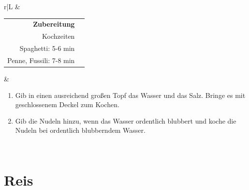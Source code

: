 \documentclass[a4paper, 12pt]{scrbook} 								%
\numberwithin{equation}{section} 									%
\begin{document}
\begin{tabularx}{\textwidth}{r|L}
								&	\\	
		\begin{tabular}[t]{rr}
			\textbf{Zubereitung}	\\
			Kochzeiten		\\
			Spaghetti: 5-6 min \\
			Penne, Fussili: 7-8 min \\
		\end{tabular}			&	\begin{enumerate}[]
										\item Gib in einen ausreichend großen Topf das Wasser und das Salz. Bringe es mit geschlossenem Deckel zum Kochen.
										\item Gib die Nudeln hinzu, wenn das Wasser ordentlich blubbert und koche die Nudeln bei ordentlich blubberndem Wasser.
									\end{enumerate}	\\
	\end{tabularx}
	\newpage


	\section{Reis}
\end{document}
